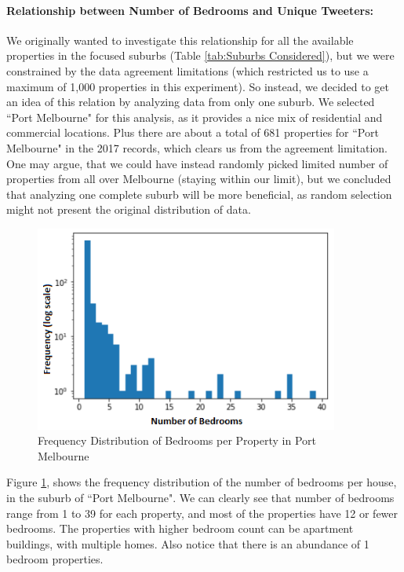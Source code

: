 \documentclass[12pt]{report}
\theoremstyle{named}
\begin{document}
\paragraph{Relationship between Number of Bedrooms and Unique Tweeters:\\}
We originally wanted to investigate this relationship for all the available properties in the focused suburbs (Table \ref{tab:Suburbs Considered}), but we were constrained by the data agreement limitations (which restricted us to use a maximum of 1,000 properties in this experiment). So instead, we decided to get an idea of this relation by analyzing data from only one suburb. We selected ``Port Melbourne"  for this analysis, as it provides a nice mix of residential and commercial locations. Plus there are about a total of 681 properties for ``Port Melbourne" in the 2017 records, which clears us from the agreement limitation. 
One may argue, that we could have instead randomly picked limited number of properties from all over Melbourne (staying within our limit), but we concluded that analyzing one complete suburb will be more beneficial, as random selection might not present the original distribution of data.

\begin{figure}[ht]
\centering
        \includegraphics[width=100mm,scale=1]{Images/bedRoomFrequencyDistribuion.PNG}
    \caption{Frequency Distribution of Bedrooms per Property in Port Melbourne}
    \label{fig:BedRoomDistribution}
\end{figure}

Figure \ref{fig:BedRoomDistribution}, shows the frequency distribution of the number of bedrooms per house, in the suburb of ``Port Melbourne". We can clearly see that number of bedrooms range from 1 to 39 for each property, and most of the properties have 12 or fewer bedrooms. The properties with higher bedroom count can be apartment buildings, with multiple homes. Also notice that there is an abundance of 1 bedroom properties.
\end{document}
